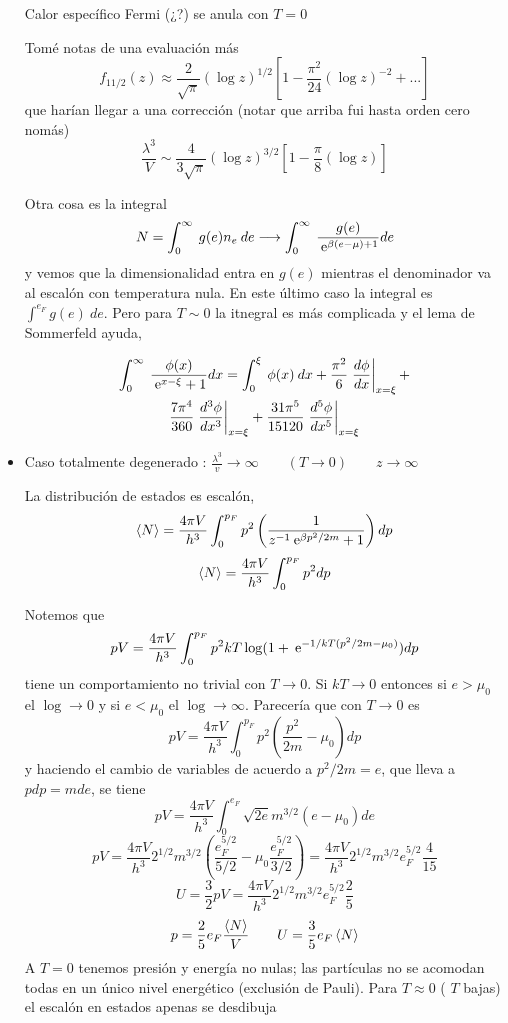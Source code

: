 \documentclass[10pt,oneside]{CBFT_book}
\begin{document}
\begin{itemize}
 Calor específico Fermi (¿?) se anula con $ T = 0 $
 
 Tomé notas de una evaluación más
 \[
	f_{11/2}(z) \approx \frac{2}{\sqrt{\pi}}(\log z)^{1/2} \left[ 1 - \frac{\pi^2}{24}(\log z)^{-2} + ... \right]
 \]
 que harían llegar a una corrección (notar que arriba fui hasta orden cero nomás)
 \[
	\frac{\lambda^3}{V} \sim \frac{4}{3\sqrt{\pi}} (\log z)^{3/2} \left[ 1 - \frac{\pi}{8}(\log z) \right]
 \]
 
 Otra cosa es la integral
 \[
	N = \int_0^\infty \: g(e) n_e \: de \longrightarrow 
	\int_0^\infty \: \frac{g(e)}{ \euler^{\beta(e-\mu)+1}} de
 \]
 y vemos que la dimensionalidad entra en $g(e)$ mientras el denominador va al escalón con temperatura nula.
 En este último caso la integral es $\int^{e_F} g(e) \: de$. Pero para $T \sim 0$ la itnegral es más complicada
 y el lema de Sommerfeld ayuda,

 \begin{multline*}
	\int_0^\infty \: \frac{\phi(x)}{ \euler^{x-\xi} + 1} dx = 
	\int_0^\xi \: \phi(x) \: dx + \frac{\pi^2}{6} \dtote{\phi}{x}{x=\xi}  +\\
	\frac{7\pi^4}{360} \dtote[3]{\phi}{x}{x=\xi}  + \frac{31\pi^5}{15120} \dtote[5]{\phi}{x}{x=\xi} 
 \end{multline*}

 \item Caso totalmente degenerado : $\frac{\lambda^3}{v} \to \infty \qquad (T \to 0) \qquad z \to \infty $
 
 La distribución de estados es escalón,
 \[
	\braket{N} = \frac{ 4 \pi V }{ h^3 } \int_0^{p_F} p^2 \Frac{ 1 }{ z^{-1} \euler^{\beta p^2 / 2m } + 1} dp
 \]
 \[
	\braket{N} = \frac{ 4 \pi V }{ h^3 } \int_0^{p_F} p^2 dp
 \]
 
 Notemos que 
 \[
	pV = \frac{ 4 \pi V }{ h^3 } \int_0^{p_F} p^2 kT \log (1 + \euler^{ -1/kT( p^2/2m - \mu_0 )} ) dp
 \]
 tiene un comportamiento no trivial con $ T \to 0 $. Si $ kT \to 0 $ entonces si $e > \mu_0$ el $\log \to 0$
 y si $e < \mu_0$ el $\log \to \infty $.
 Parecería que con $ T \to 0 $ es
 \[
 	pV = \frac{ 4 \pi V }{ h^3 } \int_0^{p_F} p^2 \left( \frac{ p^2 }{ 2m } - \mu_0 \right) dp
 \]
 y haciendo el cambio de variables de acuerdo a $ p^2 / 2m = e $, que lleva a $ pdp = m de $, se tiene 
 \[
 	pV = \frac{ 4 \pi V }{ h^3 } \int_0^{e_F} \sqrt{2e} m^{3/2} ( e -\mu_0 ) de
 \]
 \[
	pV = \frac{ 4 \pi V }{ h^3 } 2^{ 1/2 } m^{ 3/2 } 
	\left( \frac{e_F^{ 5/2 }}{5/2} - \mu_0 \frac{e_F^{ 5/2 }}{3/2} \right) =
	\frac{ 4 \pi V }{ h^3 }2^{ 1/2 } m^{ 3/2 } e_F^{ 5/2 } \frac{ 4 }{ 15 }
 \]
 \[
	U = \frac{3}{2} p V = \frac{ 4 \pi V }{ h^3 }2^{ 1/2 } m^{ 3/2 } e_F^{ 5/2 } \frac{ 2 }{ 5 }
 \]
 \[
	p = \frac{2}{5} e_F \frac{\braket{N}}{V} \qquad U = \frac{3}{5} e_F \braket{N} 
 \]
 A $ T = 0 $ tenemos presión y energía no nulas; las partículas no se acomodan todas en un único nivel energético
 (exclusión de Pauli).
 Para $ T \approx 0 $ ( $T$ bajas) el escalón en estados apenas se desdibuja


\end{itemize}
\end{document}
